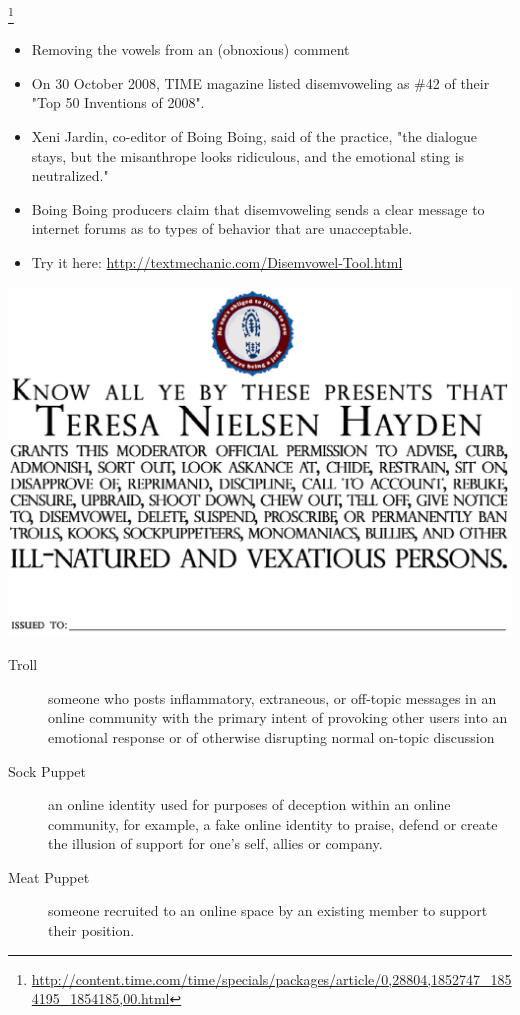 \documentclass[a4paper,landscape,headrule,footrule,xetex]{foils}
\begin{document}
\footnote{\url{http://content.time.com/time/specials/packages/article/0,28804,1852747_1854195_1854185,00.html}}
\begin{itemize}
\item Removing the vowels from an (obnoxious) comment
\item On 30 October 2008, TIME magazine listed disemvoweling as \#42
  of their "Top 50 Inventions of 2008". %
\item Xeni Jardin, co-editor of Boing Boing, said of the practice, "the dialogue stays, but the misanthrope looks ridiculous, and the emotional sting is neutralized."
\item Boing Boing producers claim that disemvoweling sends a clear message to internet forums as to types of behavior that are unacceptable.
\item Try it here:
  \url{http://textmechanic.com/Disemvowel-Tool.html}
\end{itemize}

\begin{center}
  \includegraphics[height=\textheight]{../pics/moderate}
\end{center}


\begin{description}
\item[Troll] someone who posts inflammatory, extraneous, or off-topic
  messages in an online community with the primary intent of provoking
  other users into an emotional response or of otherwise disrupting
  normal on-topic discussion

\item[Sock Puppet] an online identity used for purposes of deception
  within an online community, for example, a fake online identity to
  praise, defend or create the illusion of support for one's self,
  allies or company.

\item[Meat Puppet] someone recruited to an online space by an existing
  member to support their position.
\end{description}
\end{document}
